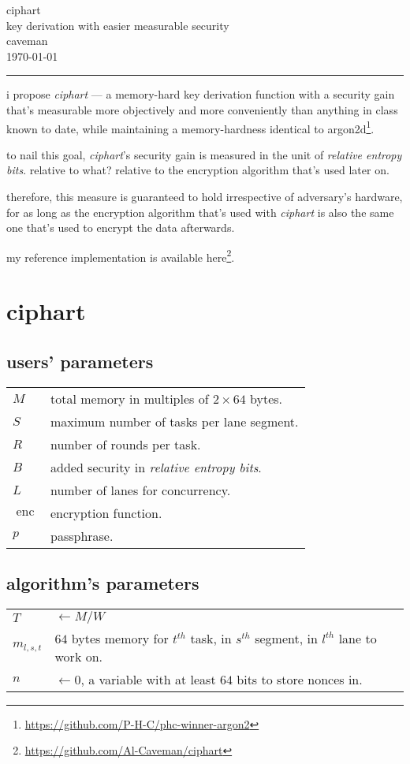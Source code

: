 \documentclass[twocolumn]{article}
\DeclareMathOperator{\enc}{enc}
\begin{document}
\begin{center}
\Huge
\noindent\xrfill[.5ex]{2pt}ciphart\xrfill[.5ex]{2pt}\\
\LARGE
key derivation with easier measurable security\\
\normalsize
caveman\\
\today\\
\rule{1\columnwidth}{2pt}
\end{center}

i propose \emph{ciphart} --- a memory-hard key derivation function with a
security gain that's measurable more objectively and more conveniently than
anything in class known to date, while maintaining a memory-hardness
identical to
argon2d\footnote{\url{https://github.com/P-H-C/phc-winner-argon2}}.

to nail this goal, \emph{ciphart}'s security gain is measured in the unit
of \emph{relative entropy bits}.  relative to what?  relative to the
encryption algorithm that's used later on.

therefore, this measure is guaranteed to hold irrespective of adversary's
hardware, for as long as the encryption algorithm that's used with
\emph{ciphart} is also the same one that's used to encrypt the data
afterwards.

my reference implementation is available
here\footnote{\url{https://github.com/Al-Caveman/ciphart}}.

\section{ciphart}
\subsection{users' parameters}
\begin{tabular}{lp{18em}}
    $M$ & total memory in multiples of $2 \times 64$ bytes.\\
    $S$ & maximum number of tasks per lane segment.\\
    $R$ & number of rounds per task.\\
    $B$ & added security in \emph{relative entropy bits}.\\
    $L$ & number of lanes for concurrency.\\
    $\enc$ & encryption function.\\
    $p$ & passphrase.\\
\end{tabular}

\subsection{algorithm's parameters}
\begin{tabular}{lp{18em}}
    $T$ & $\gets M/W$\\
    $m_{l,s,t}$ & $64$ bytes memory for $t^{th}$ task, in $s^{th}$ segment,
    in $l^{th}$ lane to work on.\\
    $n$ & $\gets 0$, a variable with at least $64$ bits to store nonces
    in.\\
\end{tabular}
\end{document}
